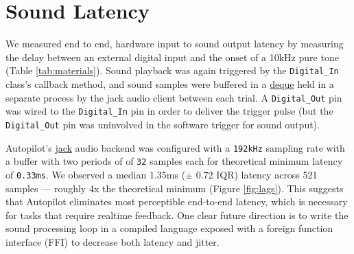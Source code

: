 \section{Sound Latency}
\label{sec:soundlatency}

We measured end to end, hardware input to sound output latency by measuring the delay between an external digital input and the onset of a 10kHz pure tone (Table \ref{tab:materials}). Sound playback was again triggered by the \texttt{Digital\_In} class's callback method, and sound samples were buffered in a \href{https://docs.python.org/3/library/collections.html#collections.deque}{deque} held in a separate process by the jack audio client between each trial. A \texttt{Digital\_Out} pin was wired to the \texttt{Digital\_In} pin in order to deliver the trigger pulse (but the \texttt{Digital\_Out} pin was uninvolved in the software trigger for sound output).

Autopilot's \href{http://jackaudio.org/}{jack} audio backend was configured with a \texttt{192kHz} sampling rate with a buffer with two periods of of \texttt{32} samples each for theoretical minimum latency of \texttt{0.33ms}. We observed a median 1.35ms ($\pm$ 0.72 IQR) latency across 521 samples --- roughly 4x the theoretical minimum (Figure \ref{fig:lags}). This suggests that Autopilot eliminates most perceptible end-to-end latency, which is necessary for tasks that require realtime feedback. One clear future direction is to write the sound processing loop in a compiled language exposed with a foreign function interface (FFI) to decrease both latency and jitter.

